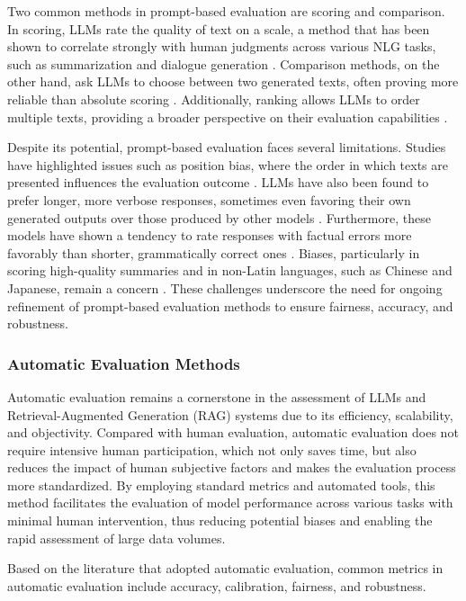 Two common methods in prompt-based evaluation are scoring and comparison. In scoring, LLMs rate the quality of text on a scale, a method that has been shown to correlate strongly with human judgments across various NLG tasks, such as summarization and dialogue generation \cite{chiang2023can}. Comparison methods, on the other hand, ask LLMs to choose between two generated texts, often proving more reliable than absolute scoring \cite{luo2023chatgpt}. Additionally, ranking allows LLMs to order multiple texts, providing a broader perspective on their evaluation capabilities \cite{ji2023exploring}.

Despite its potential, prompt-based evaluation faces several limitations. Studies have highlighted issues such as position bias, where the order in which texts are presented influences the evaluation outcome \cite{wang2023large}. LLMs have also been found to prefer longer, more verbose responses, sometimes even favoring their own generated outputs over those produced by other models \cite{zheng2024judging, liu2023g}. Furthermore, these models have shown a tendency to rate responses with factual errors more favorably than shorter, grammatically correct ones \cite{wu2023style}. Biases, particularly in scoring high-quality summaries and in non-Latin languages, such as Chinese and Japanese, remain a concern \cite{hada2023large}. These challenges underscore the need for ongoing refinement of prompt-based evaluation methods to ensure fairness, accuracy, and robustness.

\subsubsection{Automatic Evaluation Methods}

Automatic evaluation remains a cornerstone in the assessment of LLMs and Retrieval-Augmented Generation (RAG) systems due to its efficiency, scalability, and objectivity. Compared with human evaluation, automatic evaluation does not require intensive human participation, which not only saves time, but also reduces the impact of human subjective factors and makes the evaluation process more standardized. By employing standard metrics and automated tools, this method facilitates the evaluation of model performance across various tasks with minimal human intervention, thus reducing potential biases and enabling the rapid assessment of large data volumes.

Based on the literature that adopted automatic evaluation, common metrics in automatic evaluation include accuracy, calibration, fairness, and robustness.

